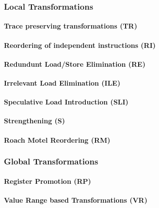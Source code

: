 \subsubsection{Local Transformations}

\paragraph{Trace preserving transformations (TR)}

\paragraph{Reordering of independent instructions (RI)}

\paragraph{Redundunt Load/Store Elimination (RE)}

\paragraph{Irrelevant Load Elimination (ILE)}

\paragraph{Speculative Load Introduction (SLI)}

\paragraph{Strengthening (S)}

\paragraph{Roach Motel Reordering (RM)}

\subsubsection{Global Transformations}

\paragraph{Register Promotion (RP)}

\paragraph{Value Range based Transformations (VR)}

